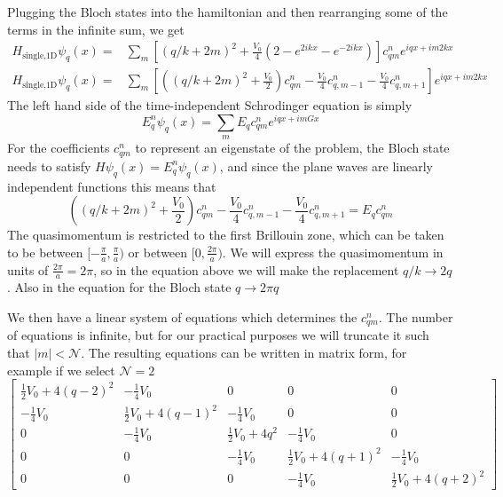\documentclass[11pt,letter]{article}
\newcommand{\vo}{\ensuremath{V_{0}}}
\begin{document}
Plugging the Bloch states into the hamiltonian and then rearranging some of the
terms in the infinite sum, we get \begin{equation}
\begin{split}
  H_{\text{single,1D}} \psi_{q}(x) = &  
      \sum_{m} \left[(q/k+2m)^{2} 
      + \frac{\vo}{4}(2-e^{2ikx}-e^{-2ikx}) \right]
      c_{qm}^{n} e^{iqx+im2kx} \\ 
  H_{\text{single,1D}} \psi_{q}(x) = &  
      \sum_{m} \left[ \left(  (q/k+2m)^{2} 
      + \frac{\vo}{2} \right) c_{qm}^{n} 
      - \frac{\vo}{4}c_{q,m-1}^{n} - \frac{\vo}{4}c_{q,m+1}^{n} \right] 
      e^{iqx+im2kx} 
\end{split}
\end{equation}
The left hand side of the time-independent Schrodinger equation is simply 
\begin{equation}
  E_{q}^{n}\psi_{q}(x) = \sum_{m} E_{q} c_{qm}^{n} e^{iqx+imGx}
\end{equation}
For the coefficients $c_{qm}^{n}$ to represent an eigenstate of the problem, the
Bloch state needs to satisfy $H\psi_{q}(x) = E_{q}^{n}\psi_{q}(x)$, and since the
plane waves are linearly independent functions this means that 
\begin{equation}
  \left(  (q/k+2m)^{2} + \frac{\vo}{2} \right) c_{qm}^{n}
  - \frac{\vo}{4}c_{q,m-1}^{n} - \frac{\vo}{4}c_{q,m+1}^{n} = E_{q} c_{qm}^{n} 
\end{equation}
The quasimomentum is restricted to the first Brillouin zone, which can be taken
to be between $[-\frac{\pi}{a}, \frac{\pi}{a})$ or  between $[0,\frac{2\pi}{a})$.  
We will express the quasimomentum in units of $\frac{2\pi}{a}=2\pi$, so in the
equation above we will make the replacement $q/k \rightarrow 2q$.  Also in the
equation for the Bloch state $q \rightarrow 2\pi q$ 
 
We then have a linear system of equations which determines the $c_{qm}^{n}$.
The number of equations is infinite, but for our practical purposes we will
truncate it such that $|m|<\mathcal{N}$.  The resulting equations can be
written in matrix form, for example if we select
$\mathcal{N}=2$ 
\begin{equation}
\left[\begin{smallmatrix}\frac{1}{2} V_{{0}} + 4 \left(q -2\right)^{2} & - \frac{1}{4} V_{{0}} & 0 & 0 & 0\\- \frac{1}{4} V_{{0}} & \frac{1}{2} V_{{0}} + 4 \left(q -1\right)^{2} & - \frac{1}{4} V_{{0}} & 0 & 0\\0 & - \frac{1}{4} V_{{0}} & \frac{1}{2} V_{{0}} + 4 q^{2} & - \frac{1}{4} V_{{0}} & 0\\0 & 0 & - \frac{1}{4} V_{{0}} & \frac{1}{2} V_{{0}} + 4 \left(q + 1\right)^{2} & - \frac{1}{4} V_{{0}}\\0 & 0 & 0 & - \frac{1}{4} V_{{0}} & \frac{1}{2} V_{{0}} + 4 \left(q + 2\right)^{2}\end{smallmatrix}\right]
\end{equation}
\end{document}
